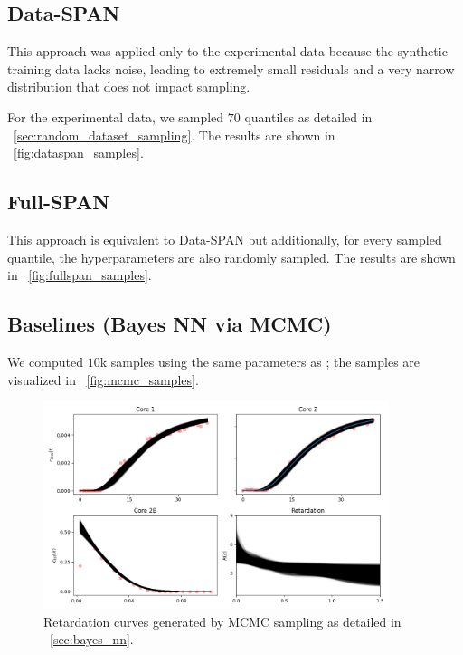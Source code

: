\subsection{Data-SPAN}
This approach was applied only to the experimental data because the synthetic training data lacks noise, leading to extremely small residuals and a very narrow distribution that does not impact sampling.

For the experimental data, we sampled $70$ quantiles as detailed in ~\vref{sec:random_dataset_sampling}. The results are shown in ~\vref{fig:dataspan_samples}.



\subsection{Full-SPAN}
This approach is equivalent to Data-SPAN but additionally, for every sampled quantile, the hyperparameters are also randomly sampled. The results are shown in ~\vref{fig:fullspan_samples}.


\subsection{Baselines (Bayes NN via MCMC)}
We computed $10$k samples using the same parameters as \cite{finn}; the samples are visualized in ~\vref{fig:mcmc_samples}.

\begin{figure}
    \centering
    \includegraphics[width=0.9\textwidth]{figs/finn_mcmc_samples.png}
    \caption{Retardation curves generated by MCMC sampling as detailed in ~\vref{sec:bayes_nn}.}
    \label{fig:mcmc_samples}
\end{figure}





